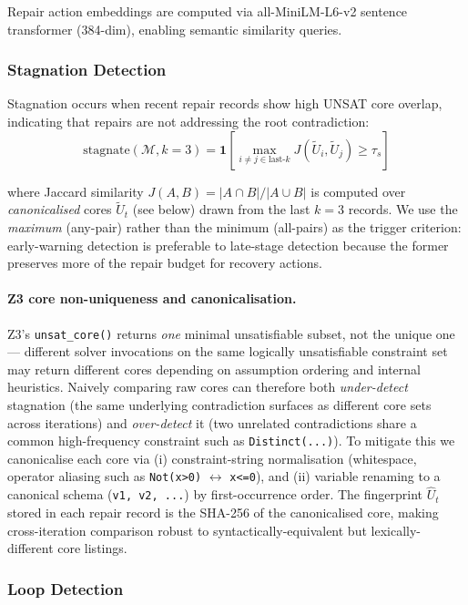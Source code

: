 Repair action embeddings are computed via all-MiniLM-L6-v2 sentence transformer (384-dim), enabling semantic similarity queries.

\subsubsection{Stagnation Detection}

Stagnation occurs when recent repair records show high UNSAT core overlap, indicating that repairs are not addressing the root contradiction:
$$\text{stagnate}(\mathcal{M}, k=3) = \mathbf{1}\!\left[\max_{i \neq j \in \text{last-}k} J(\tilde{U}_i, \tilde{U}_j) \geq \tau_s\right]$$

where Jaccard similarity $J(A,B) = |A \cap B| / |A \cup B|$ is computed over \emph{canonicalised} cores $\tilde{U}_t$ (see below) drawn from the last $k = 3$ records.  We use the \emph{maximum} (any-pair) rather than the minimum (all-pairs) as the trigger criterion: early-warning detection is preferable to late-stage detection because the former preserves more of the repair budget for recovery actions.

\paragraph{Z3 core non-uniqueness and canonicalisation.} Z3's \texttt{unsat\_core()} returns \emph{one} minimal unsatisfiable subset, not the unique one — different solver invocations on the same logically unsatisfiable constraint set may return different cores depending on assumption ordering and internal heuristics. Naively comparing raw cores can therefore both \emph{under-detect} stagnation (the same underlying contradiction surfaces as different core sets across iterations) and \emph{over-detect} it (two unrelated contradictions share a common high-frequency constraint such as \texttt{Distinct(...)}). To mitigate this we canonicalise each core via (i) constraint-string normalisation (whitespace, operator aliasing such as \texttt{Not(x>0)} $\leftrightarrow$ \texttt{x<=0}), and (ii) variable renaming to a canonical schema (\texttt{v1, v2, ...}) by first-occurrence order. The fingerprint $\hat{U}_t$ stored in each repair record is the SHA-256 of the canonicalised core, making cross-iteration comparison robust to syntactically-equivalent but lexically-different core listings.

\subsubsection{Loop Detection}

